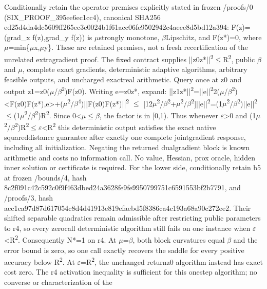 \documentclass[10pt,a4paper]{article}
\begin{document}
Conditionally retain the operator premises explicitly stated in frozen /proofs/0 (SIX\_PROOF\_395ee6ec1cc4), canonical SHA256 ed25d4da4dc5609ff265ec3c\allowbreak{}0024b1f61acc06fe9502942c\allowbreak{}4aeee8d5bd12a394: F(z)=(grad\_x f(z),grad\_y f(z)) is \ensuremath{\mu}strongly monotone, \ensuremath{\beta}Lipschitz, and F(z*)=0, where \ensuremath{\mu}=min\{\ensuremath{\mu}x,\ensuremath{\mu}y\}. These are retained premises, not a fresh recertification of the unrelated extragradient proof. The fixed contract supplies ||z0z*||\textsuperscript{2}\ensuremath{\le}R\textsuperscript{2}, public \ensuremath{\beta} and \ensuremath{\mu}, complete exact gradients, deterministic adaptive algorithms, arbitrary feasible outputs, and uncharged exactreal arithmetic. Query once at z0 and output z1=z0(\ensuremath{\mu}/\ensuremath{\beta}\textsuperscript{2})F(z0). Writing e=z0z*, expand: ||z1z*||\textsuperscript{2}=||e||\textsuperscript{2}2(\ensuremath{\mu}/\ensuremath{\beta}\textsuperscript{2}\allowbreak{})<F(z0)F(z*),e>+(\ensuremath{\mu}\textsuperscript{2}/\ensuremath{\beta}\textsuperscript{4})\allowbreak{}||F(z0)F(z*)||\textsuperscript{2} \ensuremath{\le} [12\ensuremath{\mu}\textsuperscript{2}/\ensuremath{\beta}\textsuperscript{2}+\ensuremath{\mu}\textsuperscript{2}/\ensuremath{\beta}\textsuperscript{2}]||e||\textsuperscript{2}=(\allowbreak{}1\ensuremath{\mu}\textsuperscript{2}/\ensuremath{\beta}\textsuperscript{2})||e||\textsuperscript{2}\ensuremath{\le}(1\ensuremath{\mu}\textsuperscript{2}/\ensuremath{\beta}\textsuperscript{2})\allowbreak{}R\textsuperscript{2}. Since 0<\ensuremath{\mu}\ensuremath{\le}\ensuremath{\beta}, the factor is in [0,1). Thus whenever \ensuremath{\varepsilon}>0 and (1\ensuremath{\mu}\textsuperscript{2}/\ensuremath{\beta}\textsuperscript{2})R\textsuperscript{2}\ensuremath{\le}\ensuremath{\varepsilon}<R\textsuperscript{2} this deterministic output satisfies the exact native squareddistance guarantee after exactly one complete jointgradient response, including all initialization. Negating the returned dualgradient block is known arithmetic and costs no information call. No value, Hessian, prox oracle, hidden inner solution or certificate is required. For the lower side, conditionally retain b5 at frozen /bounds/4, hash 8c2f091c42c592c0f9f463db\allowbreak{}ed24a3628fe9fe9950799751\allowbreak{}c6591553bf2b7791, and /proofs/3, hash acc1ca97d87d617054c8d4d4\allowbreak{}1913e819efaebd5f8386ca4c\allowbreak{}193a68a90c272ee2. Their shifted separable quadratics remain admissible after restricting public parameters to r4, so every zerocall deterministic algorithm still fails on one instance when \ensuremath{\varepsilon}<R\textsuperscript{2}. Consequently N*=1 on r4. At \ensuremath{\mu}=\ensuremath{\beta}, both block curvatures equal \ensuremath{\beta} and the error bound is zero, so one call exactly recovers the saddle for every positive accuracy below R\textsuperscript{2}. At \ensuremath{\varepsilon}=R\textsuperscript{2}, the unchanged returnz0 algorithm instead has exact cost zero. The r4 activation inequality is sufficient for this onestep algorithm; no converse or characterization of the 
\end{document}
